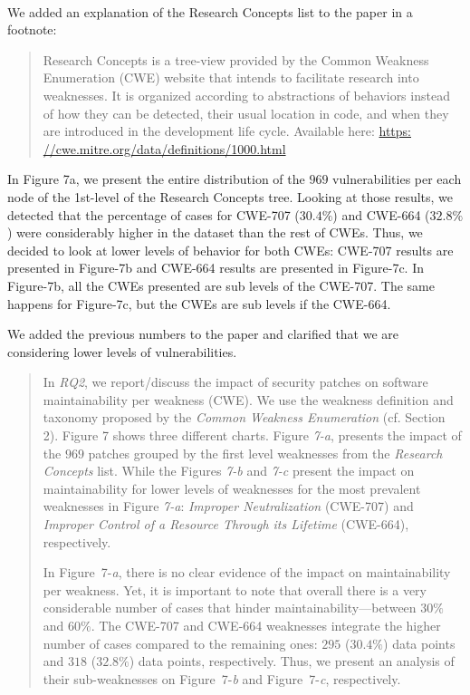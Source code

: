 \documentclass[11pt,fleqn]{article}
\newcommand{\eline}{\vspace*{.75\baselineskip}}
\newcommand{\Us}{\eline \noindent {\bf Response:}\\}
\begin{document}
\Us We added an explanation of the Research Concepts list to the paper
in a footnote:

\begin{quote}
    Research Concepts is a tree-view provided by the Common Weakness 
    Enumeration (CWE) website that intends to facilitate research into 
    weaknesses. It is organized 
    according to 
    abstractions of behaviors instead of how they can be detected, 
    their usual location in code, and when they are introduced in the 
    development life cycle. Available here: 
    \url{https: //cwe.mitre.org/data/definitions/1000.html}
\end{quote}

In Figure 7a, we present the entire distribution of the $969$ vulnerabilities per
each node of the 1st-level of the Research Concepts tree.
Looking at those results, we detected that the percentage of cases for CWE-707 ($30.4\%$) 
and CWE-664 ($32.8\%$) were considerably higher in the dataset than the rest of CWEs.
Thus, we decided to look at lower levels of behavior for both CWEs: CWE-707
results are presented in Figure-7b and CWE-664 results are presented in Figure-7c.
In Figure-7b, all the CWEs presented are sub levels of the CWE-707. The same
happens for Figure-7c, but the CWEs are sub levels if the CWE-664.

We added the previous numbers to the paper and clarified that we are considering lower levels
of vulnerabilities.

\begin{quote}
    In \emph{RQ2}, we report/discuss the impact of security patches on
    software maintainability per weakness (CWE). We use the weakness definition
    and taxonomy proposed by the \emph{Common Weakness Enumeration} (cf. Section 2).
    Figure 7 shows three different charts. Figure \emph{7-a}, presents
    the impact of the $969$ patches grouped by the first level weaknesses from
    the \emph{Research Concepts} list. While the Figures \emph{7-b} and
    \emph{7-c} present the impact on maintainability for lower levels of 
    weaknesses for the most prevalent weaknesses in Figure \emph{7-a}:
    \emph{Improper Neutralization} (CWE-707) 
    and \emph{Improper Control of a Resource 
    Through its Lifetime} (CWE-664), respectively.
    
    In Figure~7-\emph{a}, there is no clear evidence of the impact on 
    maintainability per weakness. Yet, it is important to note that
    overall there is a very considerable number of cases that hinder
    maintainability---between $30\%$ and $60\%$. The CWE-707 and CWE-664 
    weaknesses integrate the higher number of cases compared to the remaining 
    ones: $295$ ($30.4\%$) data points and $318$ ($32.8\%$) data points, respectively. 
    Thus, we present an analysis of their sub-weaknesses on 
    Figure~7-\emph{b} and Figure~7-\emph{c}, respectively. 
\end{quote}
\end{document}
